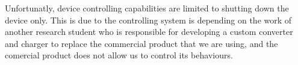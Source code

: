 \documentclass[../thesis.tex]{subfiles}
\begin{document}
Unfortunatly, device controlling capabilities are limited to shutting down the device only. This is due to the controlling system is depending on the work of another research student who is responsible for developing a custom converter and charger to replace the commercial product that we are using, and the comercial product does not allow us to control its behaviours. 
\end{document}
